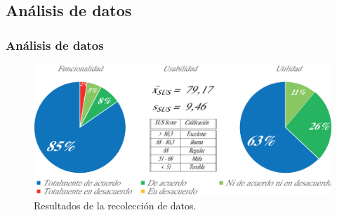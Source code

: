 \documentclass[9pt]{beamer}
\begin{document}
    \subsection{Análisis de datos}
    \begin{frame}      
        \frametitle{Análisis de datos}
        \begin{figure}
            \centering
            \includegraphics[width=\textwidth]{assets/Evaluacion/resultadosv2.eps}
            \caption{Resultados de la recolección de datos.}
        \end{figure}
    \end{frame}

    
\end{document}
